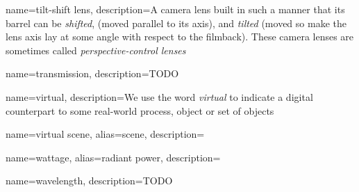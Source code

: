 {
	name={tilt-shift lens},
	description={A camera lens built in such a manner that its barrel can be \emph{shifted},
		(moved parallel to its axis), and \emph{tilted} (moved so make the lens axis 
		lay at some angle with respect to the filmback). These camera lenses are sometimes called
		\emph{perspective-control lenses}}
}

{
	name={transmission},
	description={TODO}
}

{    
	name={virtual},
	description={We use the word \textsl{virtual} to indicate a digital counterpart to some
		real-world process, object or set of objects}
}

{
	name={virtual scene},
	alias={scene},
	description=\nopostdesc
}

{    
	name={wattage},
	alias={radiant power},
	description=\nopostdesc
}

{    
	name={wavelength},
	description={TODO}
}

